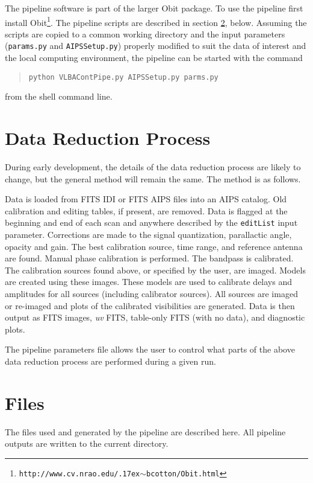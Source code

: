 \documentclass[10pt,onecolumn,final]{IEEEtran}
\renewcommand{\tilde}{\raise.17ex\hbox{$\scriptstyle\mathtt{\sim}$}}
\begin{document}
The pipeline software is part of the larger Obit package\cite{Cotton:Obit}.  To use the pipeline first install Obit\footnote{\tt http://www.cv.nrao.edu/{\tilde}bcotton/Obit.html}.  The pipeline scripts are described in section \ref{files}, below.  Assuming the scripts are copied to a common working directory and the input parameters ({\tt params.py} and {\tt AIPSSetup.py}) properly modified to suit the data of interest and the local computing environment, the pipeline can be started with the command
\begin{quote}\tt python VLBAContPipe.py AIPSSetup.py parms.py\end{quote}
from the shell command line.

\section{Data Reduction Process}

During early development, the details of the data reduction process are likely to change, but the general method will remain the same.  The method is as follows.

Data is loaded from FITS IDI or FITS AIPS files into an AIPS catalog.  Old calibration and editing tables, if present, are removed.  Data is flagged at the beginning and end of each scan and anywhere described by the {\tt editList} input parameter.  Corrections are made to the signal quantization, parallactic angle, opacity and gain.  The best calibration source, time range, and reference antenna are found.  Manual phase calibration is performed.  The bandpass is calibrated.  The calibration sources found above, or specified by the user, are imaged.  Models are created using these images.  These models are used to calibrate delays and amplitudes for all sources (including calibrator sources).  All sources are imaged or re-imaged and  plots of the calibrated visibilities are generated.  Data is then output as FITS images, {\em uv} FITS, table-only FITS (with no data), and diagnostic plots.

The pipeline parameters file allows the user to control what parts of the above data reduction process are performed during a given run. 

\section{Files} \label{files}

The files used and generated by the pipeline are described here.  All pipeline outputs are written to the current directory.
\end{document}
